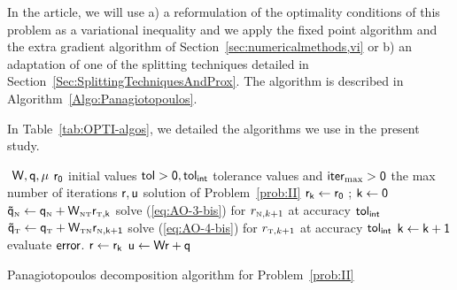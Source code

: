 In the article, we will use a) a reformulation of the optimality conditions of this problem as a variational inequality and we apply the fixed point algorithm and the extra gradient algorithm of Section~\ref{sec:numericalmethods,vi} or b) an adaptation of one of the splitting techniques detailed in Section~\ref{Sec:SplittingTechniquesAndProx}. The algorithm is described in Algorithm~\ref{Algo:Panagiotopoulos}.

In Table~\ref{tab:OPTI-algos}, we detailed the algorithms we use in the present study.

\begin{algorithm}
  \begin{algorithmic}
    {\sf
      \STATE $ $ 
      \REQUIRE $\sf W,q,\mu$
      \REQUIRE $\sf r_0$ initial values
      \REQUIRE $\sf tol >0, tol_{{int}}$  tolerance values and $\sf iter_{\max}  >0$ the max number of iterations
      \ENSURE  $\sf r,u$ solution of Problem~\ref{prob:II}
      \STATE $\sf r_{k} \leftarrow r_0 $ ; $\sf k \leftarrow 0$ 
      \STATE $\sf \tilde q_{\hbox{\tiny{N}}} \leftarrow q_{\hbox{\tiny{N}}} + W_{{\hbox{\tiny{N}}}{\hbox{\tiny{T}}}}r_{{\hbox{\tiny{T}}},k}$
      \STATE solve (\ref{eq:AO-3-bis}) for $r_{{\hbox{\tiny{N}}},k+1}$ at accuracy $\sf tol_{{int}}$
      \STATE $\sf  \tilde q_{\hbox{\tiny{T}}} \leftarrow q_{\hbox{\tiny{T}}} + W_{{\hbox{\tiny{T}}}{\hbox{\tiny{N}}}}r_{{\hbox{\tiny{N}}},k+1}$
      \STATE solve (\ref{eq:AO-4-bis}) for $r_{{\hbox{\tiny{T}}},k+1}$ at accuracy $\sf tol_{{int}}$
      \STATE $\sf k \leftarrow k+1$
      \STATE evaluate $\sf error$.
      \ENDWHILE
      \STATE $\sf r \leftarrow r_{k}$ 
      \STATE $\sf u \leftarrow W r + q$ 
    }
  \end{algorithmic}
  \caption{Panagiotopoulos decomposition algorithm for Problem~\ref{prob:II}}  \label{Algo:Panagiotopoulos}
\end{algorithm}


